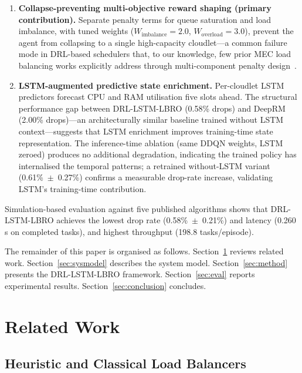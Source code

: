 \documentclass[conference]{IEEEtran}
\begin{document}
\begin{enumerate}
    \item \textbf{Collapse-preventing multi-objective reward shaping
    (primary contribution).}
    Separate penalty terms for queue saturation and load imbalance, with
    tuned weights ($W_{\text{imbalance}}{=}2.0$,
    $W_{\text{overload}}{=}3.0$), prevent the agent from collapsing to
    a single high-capacity cloudlet—a common failure mode in DRL-based
    schedulers that, to our knowledge, few prior MEC load balancing works
    explicitly address through multi-component penalty design~\cite{mao2016resource,liu2022edgelb}.

    \item \textbf{LSTM-augmented predictive state enrichment.}
    Per-cloudlet LSTM predictors forecast CPU and RAM utilisation five
    slots ahead. The structural performance gap between DRL-LSTM-LBRO
    (0.58\% drops) and DeepRM (2.00\% drops)---an architecturally
    similar baseline trained without LSTM context---suggests that LSTM
    enrichment improves training-time state representation. The
    inference-time ablation (same DDQN weights, LSTM zeroed) produces
    no additional degradation, indicating the trained policy has
    internalised the temporal patterns; a retrained without-LSTM variant
    (0.61\%~$\pm$~0.27\%) confirms a measurable drop-rate increase,
    validating LSTM's training-time contribution.
\end{enumerate}

Simulation-based evaluation against five published algorithms shows
that DRL-LSTM-LBRO achieves the lowest drop rate (0.58\%~$\pm$~0.21\%)
and latency (0.260\,s on completed tasks), and highest throughput
(198.8 tasks/episode).

The remainder of this paper is organised as follows. Section~\ref{sec:related}
reviews related work. Section~\ref{sec:sysmodel} describes the system
model. Section~\ref{sec:method} presents the DRL-LSTM-LBRO framework.
Section~\ref{sec:eval} reports experimental results. Section~\ref{sec:conclusion}
concludes.

\section{Related Work}
\label{sec:related}

\subsection{Heuristic and Classical Load Balancers}
\end{document}
